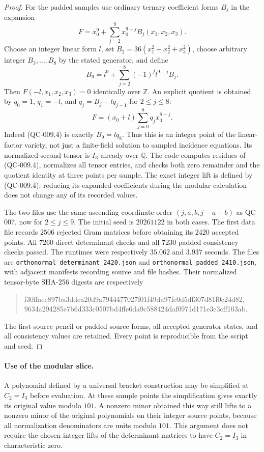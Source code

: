 \begin{proof}
For the padded samples use ordinary ternary coefficient forms
$B_j$ in the expansion
\[
 F=x_0^9+\sum_{j=2}^9x_0^{9-j}B_j(x_1,x_2,x_3).
\]
Choose an integer linear form $l$, set
$B_2=36(x_1^2+x_2^2+x_3^2)$, choose arbitrary integer
$B_3,\ldots,B_8$ by the stated generator, and define
\[
 B_9=l^9+\sum_{j=2}^8(-1)^j l^{9-j}B_j.
 \tag{QC-009.4}
\]
Then $F(-l,x_1,x_2,x_3)=0$ identically over $\mathbb Z$.
An explicit quotient is obtained by $q_0=1$,
$q_1=-l$, and $q_j=B_j-lq_{j-1}$ for $2\leq j\leq8$:
\[
 F=(x_0+l)\sum_{j=0}^8q_jx_0^{8-j}.
 \tag{QC-009.5}
\]
Indeed (QC-009.4) is exactly $B_9=lq_8$. Thus this is an
integer point of the linear-factor variety, not just a
finite-field solution to sampled incidence equations. Its
normalized second tensor is $I_3$ already over $\mathbb Q$.
The code computes residues of (QC-009.4), normalizes all
tensor entries, and checks both zero remainder and the
quotient identity at three points per sample. The exact
integer lift is defined by (QC-009.4); reducing its expanded
coefficients during the modular calculation does not change
any of its recorded values.

The two files use the same ascending coordinate order
$(j,a,b,j-a-b)$ as QC-007, now for $2\leq j\leq9$.
The initial seed is $20261122$ in both cases. The first data
file records $2506$ rejected Gram matrices before obtaining
its $2420$ accepted points. All $7260$ direct determinant
checks and all $7230$ padded consistency checks passed.
The runtimes were respectively $35.062$ and $3.937$ seconds.
The files are
\texttt{orthonormal\_determinant\_2420.json} and
\texttt{orthonormal\_padded\_2410.json}, with adjacent
manifests recording source and file hashes. Their normalized
tensor-byte SHA-256 digests are respectively
\begin{quote}\ttfamily\small
f30ffaec897ba3ddca20d9a7944477027f01f49da97fe0d5df307d81f0c24d82,\\
9634a294285e7b6d333c0507bd4ffe6da9c588424daf0971d171e3e3cff103ab.
\end{quote}
The first source pencil or padded source forms, all accepted
generator states, and all consistency values are retained.
Every point is reproducible from the script and seed.
\end{proof}

\paragraph{Use of the modular slice.}
A polynomial defined by a universal bracket construction may
be simplified at $C_2=I_3$ before evaluation. At these sample
points the simplification gives exactly its original value
modulo $101$. A nonzero minor obtained this way still lifts
to a nonzero minor of the original polynomials on their
integer source points, because all normalization denominators
are units modulo $101$. This argument does not require the
chosen integer lifts of the determinant matrices to have
$C_2=I_3$ in characteristic zero.
